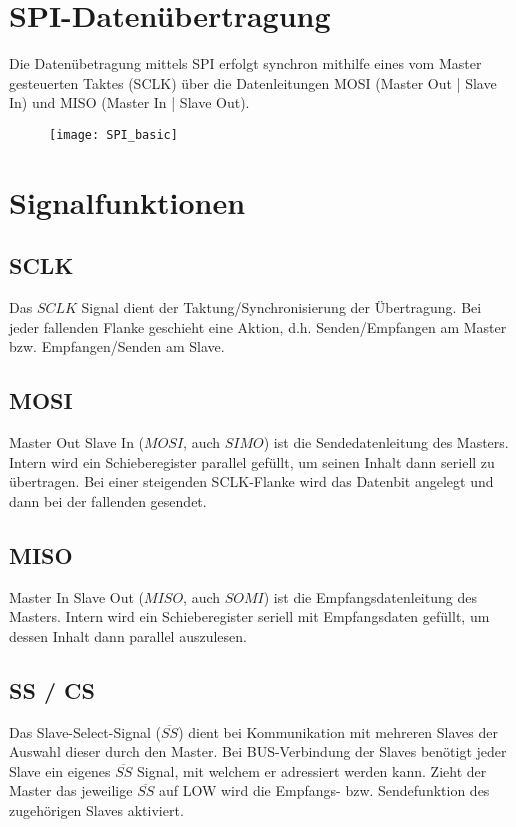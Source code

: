 \documentclass[a4paper, 11pt]{article}
\begin{document}
  
  \clearpage
  \setcounter{page}{1}

  \section{SPI-Datenübertragung}
  Die Datenübetragung mittels SPI erfolgt synchron mithilfe eines vom Master
  gesteuerten Taktes (SCLK) über die Datenleitungen MOSI (Master Out | Slave In)
  und MISO (Master In | Slave Out).

  \begin{figure}[H]
    \begin{center}
      \texttt{[image: SPI\_basic]}
  \end{center}
  \end{figure}
  \section{Signalfunktionen}
  \subsection{SCLK}
  Das $SCLK$ Signal dient der Taktung/Synchronisierung der Übertragung. Bei
  jeder fallenden Flanke geschieht eine Aktion, d.h. Senden/Empfangen am Master
  bzw. Empfangen/Senden am Slave.
  
  \subsection{MOSI}
  Master Out Slave In ($MOSI$, auch $SIMO$) ist die Sendedatenleitung des
  Masters. Intern wird ein Schieberegister parallel gefüllt, um seinen Inhalt
  dann seriell zu übertragen. Bei einer steigenden SCLK-Flanke wird das Datenbit angelegt und dann bei der
  fallenden gesendet.
  
  \subsection{MISO}
  Master In Slave Out ($MISO$, auch $SOMI$) ist die Empfangsdatenleitung des
  Masters. Intern wird ein Schieberegister seriell mit Empfangsdaten gefüllt, um
  dessen Inhalt dann parallel auszulesen.

  \subsection{SS / CS}
  Das Slave-Select-Signal ($\overline{SS}$) dient bei Kommunikation mit mehreren Slaves der
  Auswahl dieser durch den Master. Bei BUS-Verbindung der Slaves benötigt jeder
  Slave ein eigenes $\overline{SS}$ Signal, mit welchem er adressiert werden
  kann. Zieht der Master das jeweilige $\overline{SS}$ auf LOW wird die
  Empfangs- bzw. Sendefunktion des zugehörigen Slaves aktiviert.
  
\end{document}
